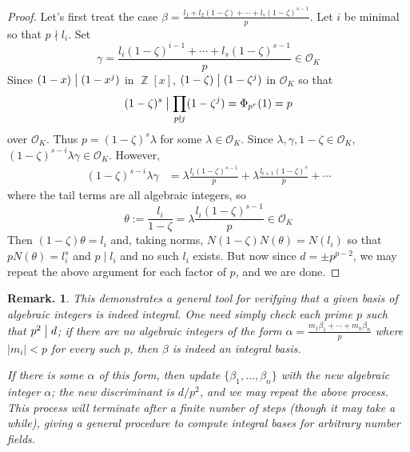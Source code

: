 \documentclass[11pt, a4paper]{memoir}
\DeclareMathOperator{\Z}{{\mathbb{Z}}}
\renewcommand{\div}{\bigm|}
\newcommand{\ndiv}{%
    \mathrel{\mkern.5mu %
        \ooalign{\hidewidth$\big|$\hidewidth\cr$/$\cr}%
    }%
}
\theoremstyle{change}
\theoremstyle{plain}
\theoremstyle{nonumberplain}
\newtheorem{remark}{Remark.}
\newtheorem{proof}{Proof}
\numberwithin{equation}{section}
\begin{document}
\begin{proof}
    Let's first treat the case $\beta=\frac{l_1+l_2(1-\zeta)+\cdots+l_s(1-\zeta)^{s-1}}{p}$.
    Let $i$ be minimal so that $p\nmid l_i$.
    Set
    \begin{equation*}
        \gamma=\frac{l_i(1-\zeta)^{i-1}+\cdots+l_s(1-\zeta)^{s-1}}{p}\in\mathcal{O}_K
    \end{equation*}
    Since $(1-x)\div(1-x^j)$ in $\Z[x]$, $(1-\zeta)\div(1-\zeta^j)$ in $\mathcal{O}_K$ so that
    \begin{equation*}
        (1-\zeta)^s\div \prod_{p\nmid j}(1-\zeta^j)=\Phi_{p^r}(1)=p
    \end{equation*}
    over $\mathcal{O}_K$.
    Thus $p=(1-\zeta)^s\lambda$ for some $\lambda\in\mathcal{O}_K$.
    Since $\lambda,\gamma,1-\zeta\in\mathcal{O}_K$, $(1-\zeta)^{s-i}\lambda\gamma\in\mathcal{O}_K$.
    However,
    \begin{align*}
        (1-\zeta)^{s-i}\lambda\gamma &= \lambda\frac{l_i(1-\zeta)^{s-1}}{p}+\lambda\frac{l_{i+1}(1-\zeta)^s}{p}+\cdots
    \end{align*}
    where the tail terms are all algebraic integers, so
    \begin{equation*}
        \theta:=\frac{l_i}{1-\zeta}=\lambda\frac{l_i(1-\zeta)^{s-1}}{p}\in\mathcal{O}_K
    \end{equation*}
    Then $(1-\zeta)\theta=l_i$ and, taking norms, $N(1-\zeta)N(\theta)=N(l_i)$ so that $pN(\theta)=l_i^s$ and $p\mid l_i$ and no such $l_i$ exists.
    But now since $d=\pm p^{p-2}$, we may repeat the above argument for each factor of $p$, and we are done.
\end{proof}
\begin{remark}
    This demonstrates a general tool for verifying that a given basis of algebraic integers is indeed integral.
    One need simply check each prime $p$ such that $p^2\div d$; if there are no algebraic integers of the form $\alpha=\frac{m_1\beta_1+\cdots+m_n\beta_n}{p}$ where $|m_i|<p$ for every such $p$, then $\beta$ is indeed an integral basis.

    If there is some $\alpha$ of this form, then update $\{\beta_1,\ldots,\beta_n\}$ with the new algebraic integer $\alpha$; the new discriminant is $d/p^2$, and we may repeat the above process.
    This process will terminate after a finite number of steps (though it may take a while), giving a general procedure to compute integral bases for arbitrary number fields.
\end{remark}
\end{document}
